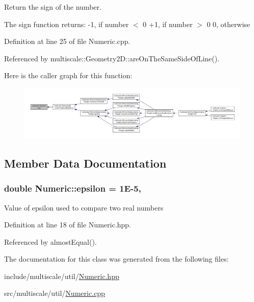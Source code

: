 Return the sign of the number. 

The sign function returns\-: -\/1, if number $<$ 0 +1, if number $>$ 0 0, otherwise 

Definition at line 25 of file Numeric.\-cpp.



Referenced by multiscale\-::\-Geometry2\-D\-::are\-On\-The\-Same\-Side\-Of\-Line().



Here is the caller graph for this function\-:\nopagebreak
\begin{figure}[H]
\begin{center}
\leavevmode
\includegraphics[width=350pt]{classmultiscale_1_1Numeric_a2b3058c5ad27aaaef338a29b96cdbced_icgraph}
\end{center}
\end{figure}




\subsection{Member Data Documentation}
\hypertarget{classmultiscale_1_1Numeric_ac66cc2092ff149af068ac93aa3a6cc51}{
\subsubsection[{epsilon}]{\setlength{\rightskip}{0pt plus 5cm}double Numeric\-::epsilon = 1\-E-\/5\hspace{0.3cm}{\ttfamily [static]}, {\ttfamily [private]}}}\label{classmultiscale_1_1Numeric_ac66cc2092ff149af068ac93aa3a6cc51}
Value of epsilon used to compare two real numbers 

Definition at line 18 of file Numeric.\-hpp.



Referenced by almost\-Equal().



The documentation for this class was generated from the following files\-:\begin{DoxyCompactItemize}
\item 
include/multiscale/util/\hyperlink{Numeric_8hpp}{Numeric.\-hpp}\item 
src/multiscale/util/\hyperlink{Numeric_8cpp}{Numeric.\-cpp}\end{DoxyCompactItemize}
